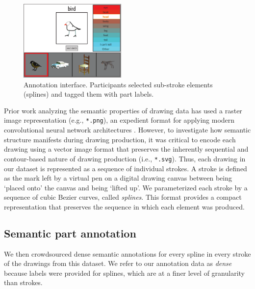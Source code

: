 \documentclass[10pt,letterpaper]{article}
\begin{document}
\begin{figure}[ht] 
\centering
\includegraphics[width=0.47\textwidth]{figures/4_annotation_interface.pdf}
\caption{Annotation interface. Participants selected sub-stroke elements (splines) and tagged them with part labels.} %
\label{annotation_interface}
\vspace{-1em}
\end{figure}

Prior work analyzing the semantic properties of drawing data has used a raster image representation (e.g., \texttt{*.png}), an expedient format for applying modern convolutional neural network architectures . 
However, to investigate how semantic structure manifests during drawing production, it was critical to encode each drawing using a vector image format that preserves the inherently sequential and contour-based nature of drawing production (i.e., \texttt{*.svg}). 
Thus, each drawing in our dataset is represented as a sequence of individual strokes. 
A stroke is defined as the mark left by a virtual pen on a digital drawing canvas between being `placed onto' the canvas and being `lifted up'. %
We parameterized each stroke by a sequence of cubic Bezier curves, called \textit{splines}.
This format provides a compact representation that preserves the sequence in which each element was produced.

\subsection{Semantic part annotation}

We then crowdsourced dense semantic annotations for every spline in every stroke of the drawings from this dataset. 
We refer to our annotation data as \textit{dense} because labels were provided for splines, which are at a finer level of granularity than strokes.
\end{document}
